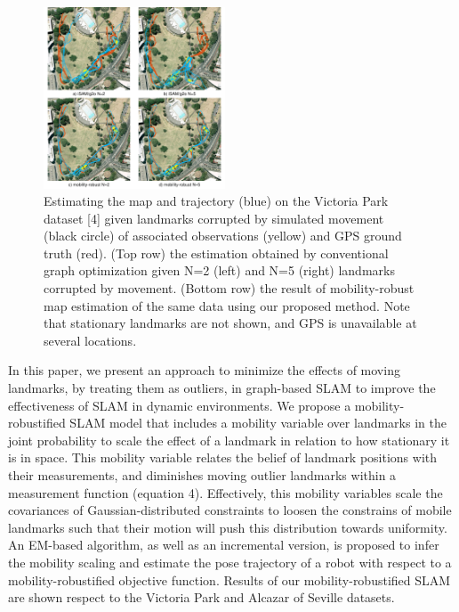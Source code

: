 \begin{figure}[t!]
\centering
  \includegraphics[width=0.48\textwidth]{fig/teaser}
  \caption{Estimating the map and trajectory (blue) on the Victoria Park dataset [4] given landmarks corrupted by simulated movement (black circle) of associated observations (yellow) and GPS ground truth (red).  (Top row) the estimation obtained by conventional graph optimization given N=2 (left) and N=5 (right) landmarks corrupted by movement. (Bottom row) the result of mobility-robust map estimation of the same data using our proposed method. Note that stationary landmarks are not shown, and GPS is unavailable at several locations.}
  \label{fig:teaser}
\end{figure}

In this paper, we present an approach to minimize the effects of
moving landmarks, by treating them as outliers, in graph-based SLAM to
improve the effectiveness of SLAM in dynamic environments.  We
propose a mobility-robustified SLAM model that includes a mobility
variable over landmarks in the joint probability to scale the effect
of a landmark in relation to how stationary it is in space.  This
mobility variable relates the belief of landmark positions with their
measurements, and diminishes moving outlier landmarks within a
measurement function (equation 4).
Effectively, this mobility variables scale the covariances
of Gaussian-distributed constraints to loosen the constrains of mobile landmarks such that their motion will push this distribution towards uniformity.
  An EM-based algorithm, as well as
an incremental version, is proposed to infer the mobility scaling
and estimate the pose trajectory of a robot with respect to a
mobility-robustified objective function. Results of our
mobility-robustified SLAM are shown respect to the
Victoria Park \cite{isam} and Alcazar of Seville \cite{iros14-frog} datasets.
